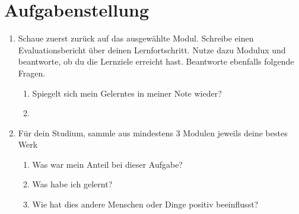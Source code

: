 \documentclass[a4paper,oneside]{scrarticle}
\begin{document}
	\section*{Aufgabenstellung}

	\begin{enumerate}
		\item Schaue zuerst zurück auf das ausgewählte Modul. Schreibe einen Evaluationsbericht über deinen Lernfortschritt. Nutze dazu Modulux und beantworte, ob du die Lernziele erreicht hast. Beantworte ebenfalls folgende Fragen.
		\begin{enumerate}
			\item Spiegelt sich mein Gelerntes in meiner Note wieder?
			\item 
		\end{enumerate}
		\item Für dein Studium, sammle aus mindestens 3 Modulen jeweils deine bestes Werk
		\begin{enumerate}
			\item Was war mein Anteil bei dieser Aufgabe?
			\item Was habe ich gelernt?
			\item Wie hat dies andere Menschen oder Dinge positiv beeinflusst?
		\end{enumerate}

	\end{enumerate}
\end{document}
